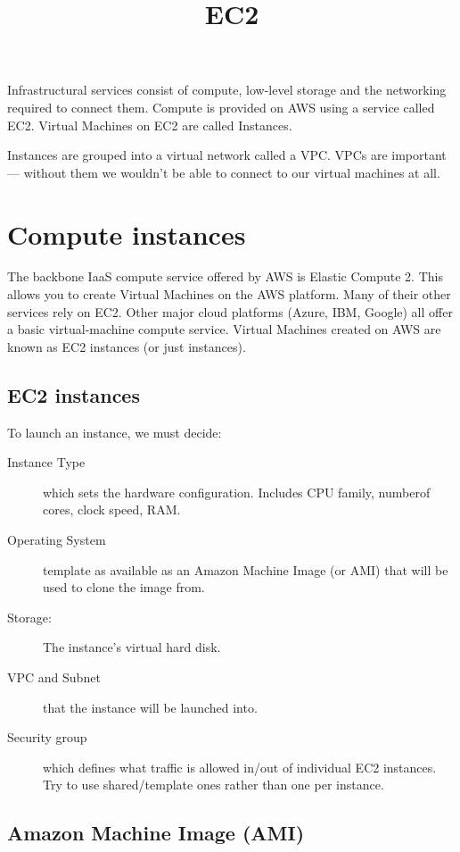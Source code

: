 \documentclass{pgnotes}
\title{EC2}
\begin{document}
\maketitle

Infrastructural services consist of compute, low-level storage and the networking required to connect them.
Compute is provided on AWS using a service called EC2.
Virtual Machines on EC2 are called Instances.

Instances are grouped into a virtual network called a VPC.
VPCs are important --- without them we wouldn't be able to connect to our virtual machines at all.

\section{Compute instances}
\label{sec:compute-instances}

The backbone IaaS compute service offered by AWS is Elastic Compute 2.
This allows you to create Virtual Machines on the AWS platform.
Many of their other services rely on EC2.
Other major cloud platforms (Azure, IBM, Google) all offer a basic virtual-machine compute service.
Virtual Machines created on AWS are known as EC2 instances (or just instances).

\subsection{EC2 instances}
\label{sec:ec2-instances}

To launch an instance, we must decide:

\begin{description}
\item[Instance Type]
  which sets the hardware configuration.
  Includes CPU family, numberof cores, clock speed, RAM.
\item[Operating System]
  template as available as an Amazon Machine Image (or AMI) that will be used to clone the image from.
\item[Storage:]
  The instance's virtual hard disk.
\item[VPC and Subnet]
  that the instance will be launched into.
\item[Security group]
  which defines what traffic is allowed in/out of individual EC2
  instances.
  Try to use shared/template ones rather than one per instance.
\end{description}

\subsection{Amazon Machine Image (AMI)}
\label{sec:amazon-machine-image-ami}
\end{document}

